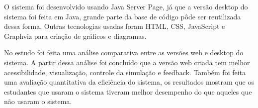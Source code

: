 O sistema foi desenvolvido usando Java Server Page, já que a versão desktop do sistema foi feita em Java, grande parte da base de código pôde ser reutilizada dessa forma. Outras tecnologias usadas foram HTML, CSS, JavaScript e Graphviz para criação de gráficos e diagramas.

No estudo foi feita uma análise comparativa entre as versões web e desktop do sistema. A partir dessa análise foi concluído que a versão web criada tem melhor acessibilidade, visualização, controle da simulação e feedback. Também foi feita uma avaliação quantitativa da eficiência do sistema, os resultados mostram que os estudantes que usaram o sistema tiveram melhor desempenho do que aqueles que não usaram o sistema.




